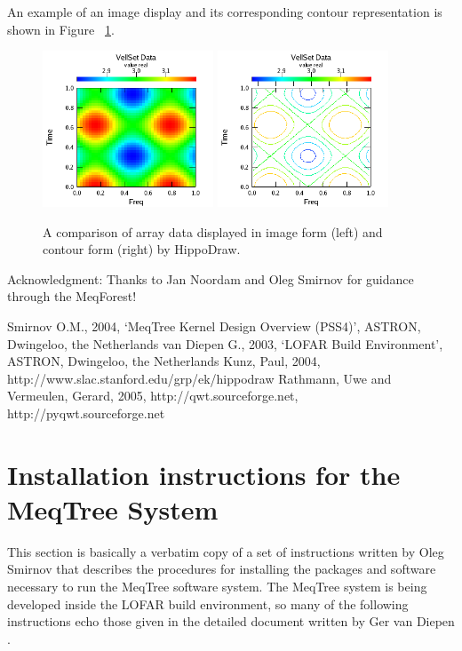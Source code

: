 \documentclass[10pt]{article}
\begin{document}
An example of an image display and its corresponding contour representation is
shown in Figure ~\ref{fig:comparison}.


\begin{figure}
\begin{center}
\includegraphics[width=2in]{FiguresAndDiagrams/image_display}
\includegraphics[width=2in]{FiguresAndDiagrams/contour_display}
\end{center}
\caption {A comparison of array data displayed in image form (left) 
and contour form (right) by HippoDraw.}
\label{fig:comparison}
\end{figure}

\vspace{1.0cm}                         
Acknowledgment: Thanks to Jan Noordam and Oleg Smirnov for guidance through 
the MeqForest!

\begin{thebibliography}{}
 Smirnov O.M., 2004, `MeqTree Kernel Design Overview (PSS4)',
ASTRON, Dwingeloo, the Netherlands
 van Diepen G., 2003, `LOFAR Build Environment',
ASTRON, Dwingeloo, the Netherlands
 Kunz, Paul, 2004, http://www.slac.stanford.edu/grp/ek/hippodraw
 Rathmann, Uwe and Vermeulen, Gerard, 2005, http://qwt.sourceforge.net, http://pyqwt.sourceforge.net
\end{thebibliography}
 

\section {Installation instructions for the MeqTree System}
This section is basically a verbatim copy of a set of instructions
written by Oleg Smirnov that describes the procedures for installing the 
packages and software necessary to run the MeqTree software system.
The MeqTree system is being developed inside the LOFAR build environment,
so many of the following instructions echo those given in the detailed
document written by Ger van Diepen \cite{diepen}.
\end{document}

